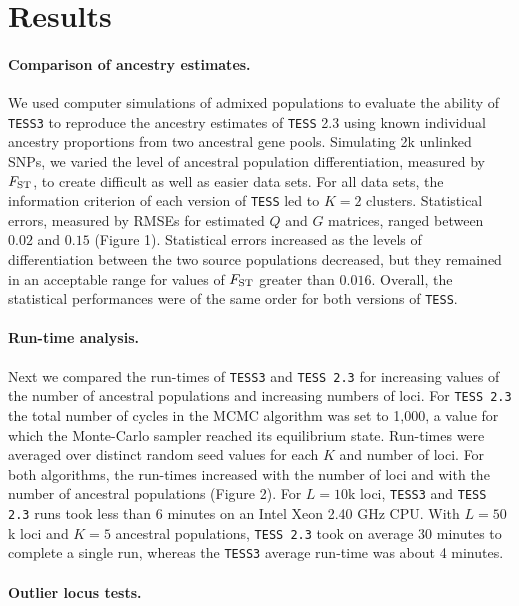   

\section{Results}

\paragraph{Comparison of ancestry estimates.}
We used computer simulations of admixed populations to evaluate the ability of {\tt TESS3} to reproduce the ancestry estimates of {\tt TESS} 2.3 using known individual ancestry proportions from two ancestral gene pools. Simulating 2k unlinked SNPs, we varied the level of ancestral population differentiation, measured by $F_{\rm ST}$, to create difficult as well as easier data sets.  For all data sets, the information criterion of each version of {\tt TESS} led to $K = 2$ clusters. Statistical errors, measured by RMSEs for estimated $Q$ and $G$ matrices, ranged between $0.02$ and $0.15$ (Figure 1). Statistical errors increased as the levels of differentiation between the two source populations decreased, but they remained in an acceptable range for values of $F_{\rm ST}$ greater than $0.016$. Overall, the statistical performances were of the same order for both versions of {\tt TESS}. 

\paragraph{Run-time analysis.}
Next we compared the run-times of {\tt TESS3} and {\tt TESS 2.3} for increasing values of the number of ancestral populations and increasing numbers of loci. For {\tt TESS 2.3} the total number of cycles in the MCMC algorithm was set to 1,000, a value for which the Monte-Carlo sampler reached its equilibrium state. Run-times were averaged over distinct random seed values for each $K$ and number of loci. For both algorithms, the run-times increased with the number of loci and with the number of ancestral populations (Figure 2). For $L = 10$k loci, {\tt TESS3} and {\tt TESS 2.3} runs took less than 6 minutes on an Intel Xeon 2.40 GHz CPU. With $L = 50$k loci and $K = 5$ ancestral populations, {\tt TESS 2.3} took on average 30 minutes to complete a single run, whereas the {\tt TESS3} average run-time was about 4 minutes.
  

\paragraph{Outlier locus tests.}

